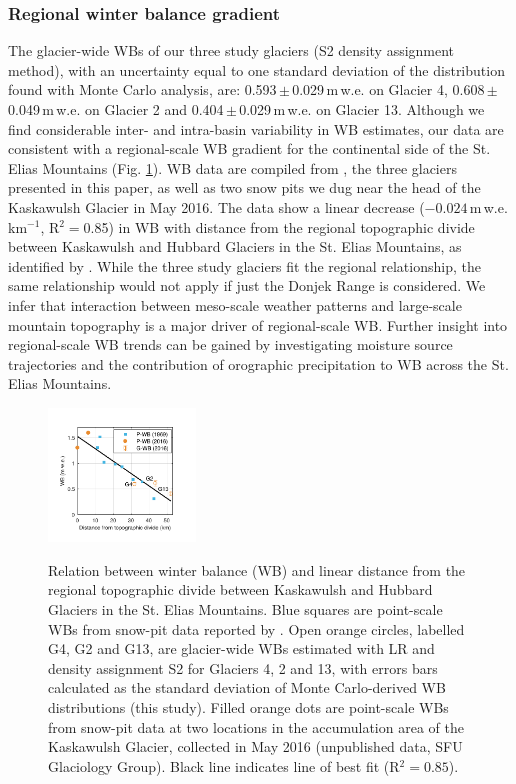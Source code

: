 \documentclass[twocolumn, letterpaper]{igs}
\begin{document}
\subsubsection{Regional winter balance gradient}

The glacier-wide WBs of our three study glaciers (S2 density assignment method), with an uncertainty equal to one standard deviation of the distribution found with Monte Carlo analysis, are: 0.593\,$\pm$\,0.029\,m\,w.e. on Glacier 4, 0.608\,$\pm$\,0.049\,m\,w.e. on Glacier 2 and 0.404\,$\pm$\,0.029\,m\,w.e. on Glacier 13. Although we find considerable inter- and intra-basin variability in WB estimates, our data are consistent with a regional-scale WB gradient for the continental side of the St. Elias Mountains (Fig. \ref{fig:AccumGrad}). WB data are compiled from \cite{Taylor1969}, the three glaciers presented in this paper, as well as two snow pits we dug near the head of the Kaskawulsh Glacier in May 2016. The data show a linear decrease ($-0.024$\,m\,w.e. km$^{-1}$, R$^2=$0.85) in WB with distance from the regional topographic divide between Kaskawulsh and Hubbard Glaciers in the St. Elias Mountains, as identified by \cite{Taylor1969}. While the three study glaciers fit the regional relationship, the same relationship would not apply if just the Donjek Range is considered. We infer that interaction between meso-scale weather patterns and large-scale mountain topography is a major driver of regional-scale WB. Further insight into regional-scale WB trends can be gained by investigating moisture source trajectories and the contribution of orographic precipitation to WB across the St. Elias Mountains. 

\begin{figure}
	\centering
	\includegraphics[width =0.35\textwidth]{AccumGrad.pdf}\\
	\caption{Relation between winter balance (WB) and linear distance from the regional topographic divide between Kaskawulsh and Hubbard Glaciers in the St. Elias Mountains. Blue squares are point-scale WBs from snow-pit data reported by \cite{Taylor1969}. Open orange circles, labelled G4, G2 and G13, are glacier-wide WBs estimated with LR and density assignment S2 for Glaciers 4, 2 and 13, with errors bars calculated as the standard deviation of Monte Carlo-derived WB distributions (this study). Filled orange dots are point-scale WBs from snow-pit data at two locations in the accumulation area of the Kaskawulsh Glacier, collected in May 2016 (unpublished data, SFU Glaciology Group). Black line indicates line of best fit (R$^2=0.85$).}
	\label{fig:AccumGrad}
\end{figure}
\end{document}
